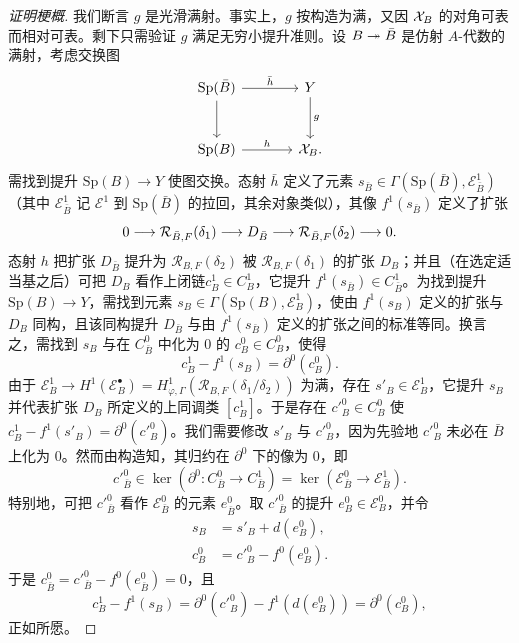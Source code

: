 \begin{proof}[证明梗概]
我们断言 $g$ 是光滑满射。事实上，$g$ 按构造为满，又因 $\mathcal{X}_B$ 的对角可表而相对可表。剩下只需验证 $g$ 满足无穷小提升准则。设 $B\twoheadrightarrow\bar B$ 是仿射 $A$-代数的满射，考虑交换图
\[
\begin{tikzcd}[row sep=large,column sep=large]
\mathrm{Sp}(\bar B)\arrow[r,"\bar h"]\arrow[d] & Y\arrow[d,"g"]\\
\mathrm{Sp}(B)\arrow[r,"h"] & \XX_B.
\end{tikzcd}
\]
需找到提升 $\mathrm{Sp}(B)\to Y$ 使图交换。态射 $\bar h$ 定义了元素 $s_{\bar B}\in\Gamma(\mathrm{Sp}(\bar B),\mathcal E^1_{\bar B})$（其中 $\mathcal E^1_{\bar B}$ 记 $\mathcal E^1$ 到 $\mathrm{Sp}(\bar B)$ 的拉回，其余对象类似），其像 $f^1(s_{\bar B})$ 定义了扩张
\[
0\longrightarrow\mathcal R_{\bar B,F}(\delta_1)\longrightarrow D_{\bar B}\longrightarrow\mathcal R_{\bar B,F}(\delta_2)\longrightarrow 0.
\]
态射 $h$ 把扩张 $D_{\bar B}$ 提升为 $\mathcal R_{B,F}(\delta_2)$ 被 $\mathcal R_{B,F}(\delta_1)$ 的扩张 $D_B$；并且（在选定适当基之后）可把 $D_B$ 看作上闭链$c^1_B\in C^1_B$，它提升 $f^1(s_{\bar B})\in C^1_{\bar B}$。为找到提升 $\mathrm{Sp}(B)\to Y$，需找到元素 $s_B\in\Gamma(\mathrm{Sp}(B),\mathcal E^1_B)$，使由 $f^1(s_B)$ 定义的扩张与 $D_B$ 同构，且该同构提升 $D_{\bar B}$ 与由 $f^1(s_{\bar B})$ 定义的扩张之间的标准等同。换言之，需找到 $s_B$ 与在 $C^0_{\bar B}$ 中化为 $0$ 的 $c^0_B\in C^0_B$，使得
\[
c^1_B-f^1(s_B)=\partial^0(c^0_B).
\]
由于 $\mathcal E^1_B\to H^1(\mathcal E^\bullet_B)=H^1_{\varphi,\Gamma}(\mathcal R_{B,F}(\delta_1/\delta_2))$ 为满，存在 $s'_B\in\mathcal E^1_B$，它提升 $s_B$ 并代表扩张 $D_B$ 所定义的上同调类 $[c^1_B]$。于是存在 $c'^0_B\in C^0_B$ 使 $c^1_B-f^1(s'_B)=\partial^0(c'^0_B)$。我们需要修改 $s'_B$ 与 $c'^0_B$，因为先验地 $c'^0_B$ 未必在 $\bar B$ 上化为 $0$。然而由构造知，其归约在 $\partial^0$ 下的像为 $0$，即
\[
c'^0_{\bar B}\in\ker(\partial^0:C^0_{\bar B}\to C^1_{\bar B})=\ker(\mathcal E^0_{\bar B}\to\mathcal E^1_{\bar B}).
\]
特别地，可把 $c'^0_{\bar B}$ 看作 $\mathcal E^0_{\bar B}$ 的元素 $e^0_{\bar B}$。取 $c'^0_{\bar B}$ 的提升 $e^0_B\in\mathcal E^0_B$，并令
\[
\begin{aligned}
s_B&=s'_B+d(e^0_B),\\
c^0_B&=c'^0_B-f^0(e^0_B).
\end{aligned}
\]
于是 $c^0_{\bar B}=c'^0_{\bar B}-f^0(e^0_{\bar B})=0$，且
\[
c^1_B-f^1(s_B)=\partial^0(c'^0_B)-f^1(d(e^0_B))=\partial^0(c^0_B),
\]
正如所愿。


\end{proof}

